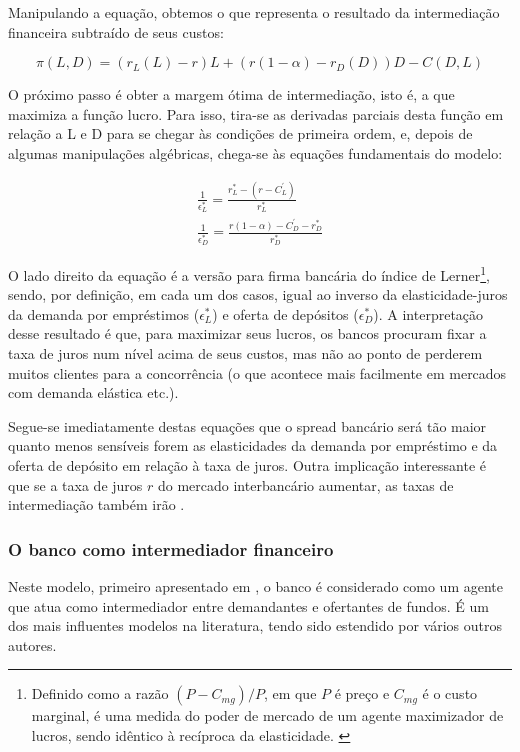 \documentclass[a4paper,
               article,
               12pt,
               openany,
               oneside,
               english,
               brazil]{abntex2}
\numberwithin{equation}{section}
\begin{document}
    Manipulando a equação, obtemos o que representa o resultado da intermediação financeira subtraído de seus custos: 
    
    \begin{equation} \pi(L, D) = (r_L(L) - r)L + (r(1 - \alpha) - r_D(D))D - C(D, L) \end{equation}

    O próximo passo é obter a margem ótima de intermediação, isto é, a que maximiza a função lucro. Para isso, tira-se as derivadas parciais desta função em relação a L e D para se chegar às condições de primeira ordem, e, depois de algumas manipulações algébricas, chega-se às equações fundamentais do modelo:

    \begin{gather}
        \frac{1}{\epsilon^{*}_L} = \frac{r^{*}_L - (r - C^{'}_L)}{r^{*}_L} \\
        \frac{1}{\epsilon^{*}_D} = \frac{r(1-\alpha)-C^{'}_D - r^{*}_D}{r^{*}_D}
    \end{gather}

    O lado direito da equação é a versão para firma bancária do índice de Lerner\footnote{Definido como a razão $(P - C_{mg}) / P$, em que $P$ é preço e $C_{mg}$ é o custo marginal, é uma medida do poder de mercado de um agente maximizador de lucros, sendo idêntico à recíproca da elasticidade. \cite{maudos}}, sendo, por definição, em cada um dos casos, igual ao inverso da elasticidade-juros da demanda por empréstimos ($\epsilon^{*}_L$) e oferta de depósitos ($\epsilon^{*}_D$). A interpretação desse resultado é que, para maximizar seus lucros, os bancos procuram fixar a taxa de juros num nível acima de seus custos, mas não ao ponto de perderem muitos clientes para a concorrência (o que acontece mais facilmente em mercados com demanda elástica etc.).

    Segue-se imediatamente destas equações que o spread bancário será tão maior quanto menos sensíveis forem as elasticidades da demanda por empréstimo e da oferta de depósito em relação à taxa de juros. Outra implicação interessante é que se a taxa de juros $ r $ do mercado interbancário aumentar, as taxas de intermediação também irão \cite[p.~59]{freixas}.

\subsubsection{O banco como intermediador financeiro}

    Neste modelo, primeiro apresentado em \textcite{hoesaunders}, o banco é considerado como um agente que atua como intermediador entre demandantes e ofertantes de fundos. É um dos mais influentes modelos na literatura, tendo sido estendido por vários outros autores.
\end{document}
